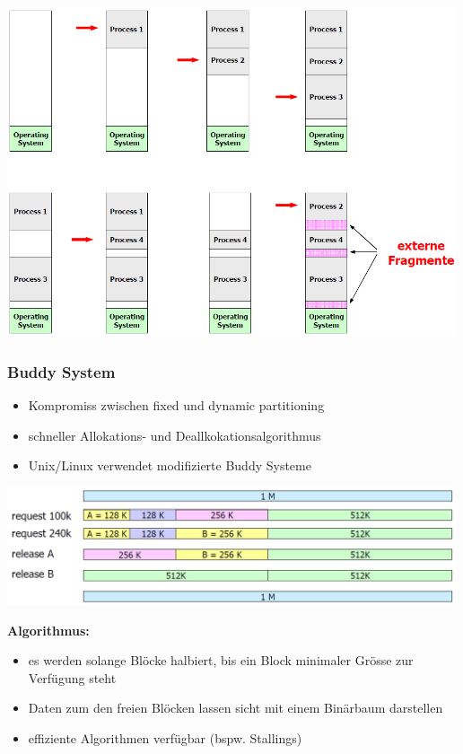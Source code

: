 \documentclass{report}
\newenvironment{Figure}
	{\par\medskip\noindent\minipage{\linewidth}}
	{\endminipage\par\medskip}
\theoremstyle{definition}
\theoremstyle{example}
\begin{document}
\begin{Figure}
\centering
\includegraphics[width=500px]{img/DynamicPartitioning.png}
	\label{fig:Abbildung dynamic partitioning}
\end{Figure}

		\subsubsection{Buddy System}
\begin{itemize}
	\item Kompromiss zwischen fixed und dynamic partitioning
	\item schneller Allokations- und Deallkokationsalgorithmus
	\item Unix/Linux verwendet modifizierte Buddy Systeme
\end{itemize}

\begin{Figure}
\centering
\includegraphics[width=500px]{img/BuddySysteme.png}
	\label{fig:Abbildung Buddy System}
\end{Figure}

\textbf{Algorithmus:}
\begin{itemize}
	\item es werden solange Blöcke halbiert, bis ein Block minimaler Grösse zur Verfügung steht
	\item Daten zum den freien Blöcken lassen sicht mit einem Binärbaum darstellen
	\item effiziente Algorithmen verfügbar (bspw. Stallings)
\end{itemize}
\end{document}
